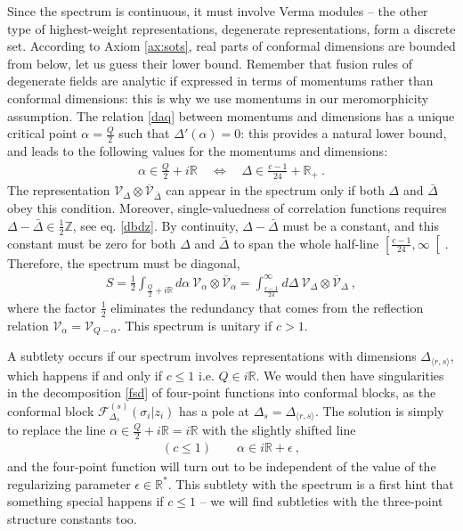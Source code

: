 \documentclass[12pt, a4paper, notitlepage, twoside]{report}
\numberwithin{equation}{section}
\theoremstyle{break}
\begin{document}
Since the spectrum is continuous, it must involve Verma modules -- the other type of highest-weight representations, degenerate representations, form a discrete set. 
According to Axiom \ref{ax:sots}, real parts of conformal dimensions are bounded from below, let us guess their lower bound. Remember that fusion rules of degenerate fields are analytic if expressed in terms of momentums rather than conformal dimensions: this is why we use momentums in our meromorphicity assumption. The relation \eqref{daq} between momentums and dimensions has a unique critical point $\alpha=\frac{Q}{2}$ such that $\Delta'(\alpha)=0$: this provides a natural lower bound, and leads to the following values for the momentums and dimensions:
\begin{align}
 \alpha \in \frac{Q}{2}+i{\mathbb{R}} \quad \Leftrightarrow \quad \Delta \in \frac{c-1}{24}+\mathbb{R}_+\ .
\label{aqd}
\end{align}
The representation $\mathcal{V}_\Delta\otimes \overline{\mathcal{V}}_{\bar{\Delta}}$ can appear in the spectrum only if both 
$\Delta$ and $\bar{\Delta}$ obey this condition. 
Moreover, single-valuedness of correlation functions requires $\Delta-\bar{\Delta}\in {\frac12\mathbb{Z}} $, see eq. \eqref{dbdz}.
By continuity, $\Delta-\bar{\Delta}$ must be a constant, and this constant must be zero for both $\Delta$ and $\bar{\Delta}$ to span the whole half-line $\left[\frac{c-1}{24},\infty\right[$.
Therefore, the spectrum must be diagonal,
\begin{align}
 \boxed{ S= \frac12\int_{\frac{Q}{2}+i{\mathbb{R}}} d\alpha\ \mathcal{V}_\alpha \otimes \overline{\mathcal{V}}_\alpha = \int_{\frac{c-1}{24}}^\infty d\Delta\ \mathcal{V}_\Delta\otimes \overline{\mathcal{V}}_\Delta} \ ,
\label{sad}
\end{align}
where the  factor $\frac12$ eliminates the redundancy that comes from the reflection relation $\mathcal{V}_\alpha=\mathcal{V}_{Q-\alpha}$. This spectrum is unitary if $c>1$.

A subtlety occurs if our spectrum involves representations with dimensions $\Delta_{\langle r, s\rangle}$, which happens if and only if $c\leq 1$ i.e. $Q\in i\mathbb{R}$. 
We would then have singularities in the decomposition \eqref{fsd} of four-point functions into conformal blocks, as the conformal block $\mathcal{F}_{\Delta_s}^{(s)}(\sigma_i|z_i)$ has a pole at $\Delta_s = \Delta_{\langle r, s\rangle}$. 
The solution is simply to replace the line $\alpha \in \frac{Q}{2} + i\mathbb{R} = i\mathbb{R}$ with the slightly shifted line 
\begin{align}
 (c\leq 1) \qquad \alpha \in i\mathbb{R} + \epsilon\ ,
\end{align}
and the four-point function will turn out to be independent of the value of the regularizing parameter $\epsilon \in \mathbb{R}^*$. 
This subtlety with the spectrum is a first hint that something special happens if $c\leq 1$ -- we will find subtleties with the three-point structure constants too. 
\end{document}
